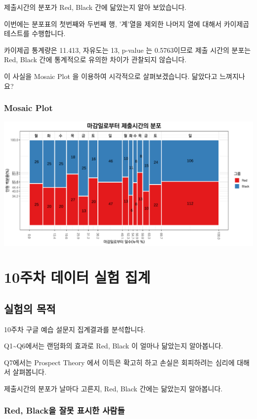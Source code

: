\documentclass[
]{book}
\begin{document}
제출시간의 분포가 Red, Black 간에 닮았는지 알아 보았습니다.

이번에는 분포표의 첫번째와 두번째 행, '계'열을 제외한 나머지 열에 대해서 카이제곱테스트를 수행합니다.

카이제곱 통계량은 11.413, 자유도는 13, p-value 는 0.5763이므로 제출 시간의 분포는 Red, Black 간에 통계적으로 유의한 차이가 관찰되지 않습니다.

이 사실을 Mosaic Plot 을 이용하여 시각적으로 살펴보겠습니다. 닮았다고 느껴지나요?

\subsection{Mosaic Plot}\label{mosaic-plot-22}

\includegraphics{Quiz_report_2025_files/figure-latex/unnamed-chunk-280-1.pdf}

\chapter{10주차 데이터 실험 집계}\label{uxc8fcuxcc28-uxb370uxc774uxd130-uxc2e4uxd5d8-uxc9d1uxacc4-9}

\section{실험의 목적}\label{uxc2e4uxd5d8uxc758-uxbaa9uxc801-10}

10주차 구글 예습 설문지 집계결과를 분석합니다.

Q1\textasciitilde Q6에서는 랜덤화의 효과로 Red, Black 이 얼마나 닮았는지 알아봅니다.

Q7에서는 Prospect Theory 에서 이득은 확고히 하고 손실은 회피하려는 심리에 대해서 살펴봅니다.

제출시간의 분포가 날마다 고른지, Red, Black 간에는 닮았는지 알아봅니다.

\subsection{Red, Black을 잘못 표시한 사람들}\label{red-blackuxc744-uxc798uxbabb-uxd45cuxc2dcuxd55c-uxc0acuxb78cuxb4e4-10}
\end{document}

